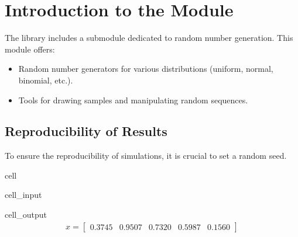 \documentclass[letterpaper,10pt,english]{jupyterBook}
\begin{document}
\section{Introduction to the  Module}
\label{\detokenize{01:introduction-to-the-numpy-random-module}}
\sphinxAtStartPar
The  library includes a  submodule dedicated to random number generation. This module offers:
\begin{itemize}
\item {} 
\sphinxAtStartPar
Random number generators for various distributions (uniform, normal, binomial, etc.).

\item {} 
\sphinxAtStartPar
Tools for drawing samples and manipulating random sequences.

\end{itemize}


\subsection{Reproducibility of Results}
\label{\detokenize{01:reproducibility-of-results}}
\sphinxAtStartPar
To ensure the reproducibility of simulations, it is crucial to set a random seed.

\begin{sphinxuseclass}{cell}\begin{sphinxVerbatimInput}

\begin{sphinxuseclass}{cell_input}
\begin{sphinxVerbatim}[commandchars=\\\{\}]
  
 
\end{sphinxVerbatim}

\end{sphinxuseclass}\end{sphinxVerbatimInput}
\begin{sphinxVerbatimOutput}

\begin{sphinxuseclass}{cell_output}\begin{equation*}
\begin{split}\displaystyle x=\left[
\begin{array}{}
  0.3745 &  0.9507 &  0.7320 &  0.5987 &  0.1560
\end{array}
\right]\end{split}
\end{equation*}
\end{sphinxuseclass}\end{sphinxVerbatimOutput}

\end{sphinxuseclass}
\end{document}
